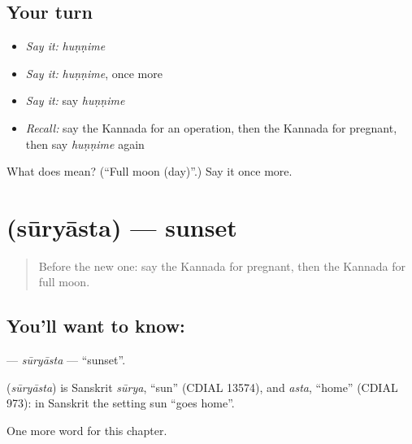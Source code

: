\subsection*{Your turn}
\begin{itemize}
\raggedright
  \item \emph{Say it:} \emph{huṇṇime}
  \item \emph{Say it:} \emph{huṇṇime}, once more
  \item \emph{Say it:} say \emph{huṇṇime}
  \item \emph{Recall:} say the Kannada for an operation, then the Kannada for pregnant, then say \emph{huṇṇime} again
\end{itemize}

\begin{tcolorbox}[breakable,colback=teal!4,colframe=teal!35!black,title={Before you move on}]
What does  mean? (\textquotedblleft{}Full moon (day)\textquotedblright{}.) Say it once more.
\end{tcolorbox}
\section[\texorpdfstring{\kn{ಸೂರ್ಯಾಸ್ತ} (sūryāsta)}{ಸೂರ್ಯಾಸ್ತ (sūryāsta)}]{ (sūryāsta) — sunset}

\label{lesson:KA-C284-suryasta}



\begin{quote}
Before the new one: say the Kannada for pregnant, then the Kannada for full moon.
\end{quote}

\subsection*{You'll want to know: }
\textbf{} — \emph{sūryāsta} — \textquotedblleft{}sunset\textquotedblright{}.

\begin{cousinweb}
\textbf{} (\emph{sūryāsta}) is Sanskrit \emph{sūrya}, \textquotedblleft{}sun\textquotedblright{} (CDIAL 13574), and \emph{asta}, \textquotedblleft{}home\textquotedblright{} (CDIAL 973): in Sanskrit the setting sun \textquotedblleft{}goes home\textquotedblright{}.
\end{cousinweb}

\begin{grammarlens}[title={What you've built}]
One more word for this chapter.
\end{grammarlens}

